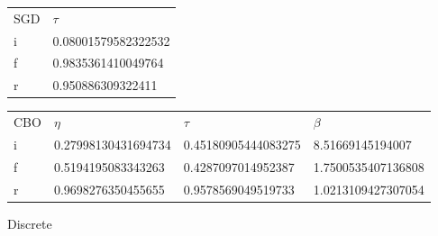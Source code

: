 \documentclass[11pt]{article}
\begin{document}
\begin{tabular}[]{@{}ll@{}}
    SGD & $\tau$\\
    i & 0.08001579582322532\\
    f & 0.9835361410049764\\
    r & 0.950886309322411
\end{tabular}

\begin{tabular}[]{@{}llll@{}}
    CBO & $\eta$ & $\tau$ & $\beta$\\
    i & 0.27998130431694734 & 0.45180905444083275 &
    8.51669145194007\\
    f & 0.5194195083343263 & 0.4287097014952387 &
    1.7500535407136808\\
    r & 0.9698276350455655 & 0.9578569049519733 &
    1.0213109427307054
\end{tabular}


Discrete
\end{document}
